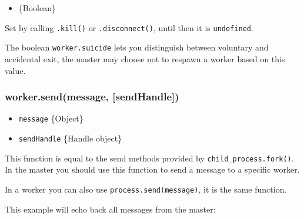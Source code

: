 \begin{itemize}
\itemsep1pt\parskip0pt
\item
  \{Boolean\}
\end{itemize}

Set by calling \texttt{.kill()} or \texttt{.disconnect()}, until then it
is \texttt{undefined}.

The boolean \texttt{worker.suicide} lets you distinguish between
voluntary and accidental exit, the master may choose not to respawn a
worker based on this value.

\begin{Shaded}
\begin{Highlighting}[]
\NormalTok{(}\NormalTok{, }
   \NormalTok{(} \NormalTok{=== }\NormalTok{) \{}
    \NormalTok{(}
  \NormalTok{\}}
\NormalTok{\});}

\NormalTok{();}
\end{Highlighting}
\end{Shaded}

\subsubsection{worker.send(message,
{[}sendHandle{]})}\label{worker.sendmessage-sendhandle}

\begin{itemize}
\itemsep1pt\parskip0pt
\item
  \texttt{message} \{Object\}
\item
  \texttt{sendHandle} \{Handle object\}
\end{itemize}

This function is equal to the send methods provided by
\texttt{child\_process.fork()}. In the master you should use this
function to send a message to a specific worker.

In a worker you can also use \texttt{process.send(message)}, it is the
same function.

This example will echo back all messages from the master:

